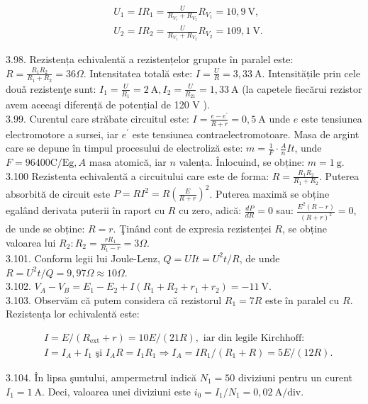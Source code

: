 \documentclass[10pt]{article}
\begin{document}
$$
\begin{aligned}
& U_{1}=I R_{1}=\frac{U}{R_{V_{1}}+R_{V_{2}}} R_{V_{1}}=10,9 \mathrm{~V}, \\
& U_{2}=I R_{2}=\frac{U}{R_{V_{1}}+R_{V_{2}}} R_{V_{2}}=109,1 \mathrm{~V} .
\end{aligned}
$$

3.98. Rezistența echivalentă a rezistențelor grupate în paralel este: $R=\frac{R_{1} R_{2}}{R_{1}+R_{2}}=36 \Omega$. Intensitatea totală este: $I=\frac{U}{R}=3,33 \mathrm{~A}$. Intensitățile prin cele douǎ rezistenţe sunt: $I_{1}=\frac{U}{R_{1}}=2 \mathrm{~A}, I_{2}=\frac{U}{R_{21}}=1,33 \mathrm{~A}$ (la capetele fiecărui rezistor avem aceeaşi diferență de potențial de 120 V ).\\
3.99. Curentul care străbate circuitul este: $I=\frac{e-e^{\prime}}{R+r}=0,5 \mathrm{~A}$ unde $e$ este tensiunea electromotore a sursei, iar $e^{\prime}$ este tensiunea contraelectromotoare. Masa de argint care se depune în timpul procesului de electroliză este: $m=\frac{1}{F} \cdot \frac{A}{n} I t$, unde $F=96400 \mathrm{C} / \mathrm{Eg}, A$ masa atomică, iar $n$ valența. Înlocuind, se obține: $m=1 \mathrm{~g}$.\\
3.100 Rezistenta echivalentă a circuitului care este de forma: $R=\frac{R_{1} R_{2}}{R_{1}+R_{2}}$. Puterea absorbită de circuit este $P=R I^{2}=R\left(\frac{E}{R+r}\right)^{2}$. Puterea maximă se obține egalând derivata puterii în raport cu $R$ cu zero, adică: $\frac{d P}{d R}=0$ sau: $\frac{E^{2}(R-r)}{(R+r)^{2}}=0$, de unde se obține: $R=r$. Ţinând cont de expresia rezistenței $R$, se obține valoarea lui $R_{2}: R_{2}=\frac{r R_{1}}{R_{1}-r}=3 \Omega$.\\
3.101. Conform legii lui Joule-Lenz, $Q=U I t=U^{2} t / R$, de unde $R=U^{2} t / Q=9,97 \Omega \approx 10 \Omega$.\\
3.102. $V_{A}-V_{B}=E_{1}-E_{2}+I\left(R_{1}+R_{2}+r_{1}+r_{2}\right)=-11 \mathrm{~V}$.\\
3.103. Observăm că putem considera că rezistorul $R_{1}=7 R$ este în paralel cu $R$. Rezistența lor echivalentă este:

$$
\begin{aligned}
& I=E /\left(R_{\mathrm{ext}}+r\right)=10 E /(21 R), \text { iar din legile Kirchhoff: } \\
& I=I_{A}+I_{1} \text { şi } I_{A} R=I_{1} R_{1} \Rightarrow I_{A}=I R_{1} /\left(R_{1}+R\right)=5 E /(12 R) .
\end{aligned}
$$

3.104. În lipsa şuntului, ampermetrul indică $N_{1}=50$ diviziuni pentru un curent $I_{1}=1 \mathrm{~A}$. Deci, valoarea unei diviziuni este $i_{0}=I_{1} / N_{1}=0,02 \mathrm{~A} / \mathrm{div}$.
\end{document}
